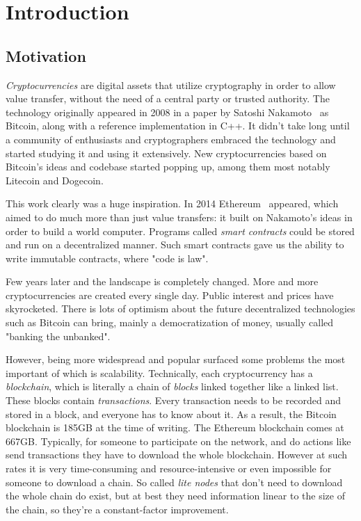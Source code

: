 \chapter{Introduction}

\section{Motivation}
\emph{Cryptocurrencies} are digital assets that utilize cryptography in order to allow value transfer, without the need of a central party or trusted authority. The technology originally appeared in 2008 in a paper by Satoshi Nakamoto~\cite{bitcoin} as Bitcoin, along with a reference implementation in C++. It didn't take long until a community of enthusiasts and cryptographers embraced the technology and started studying it and using it extensively. New cryptocurrencies based on Bitcoin's ideas and codebase started popping up, among them most notably Litecoin and Dogecoin.

This work clearly was a huge inspiration. In 2014 Ethereum~\cite{ethereum} appeared, which aimed to do much more than just value transfers: it built on Nakamoto's ideas in order to build a world computer. Programs called \emph{smart contracts} could be stored and run on a decentralized manner. Such smart contracts gave us the ability to write immutable contracts, where "code is law".

Few years later and the landscape is completely changed. More and more cryptocurrencies are created every single day. Public interest and prices have skyrocketed. There is lots of optimism about the future decentralized technologies such as Bitcoin can bring, mainly a democratization of money, usually called "banking the unbanked".

However, being more widespread and popular surfaced some problems the most important of which is scalability. Technically, each cryptocurrency has a \emph{blockchain}, which is literally a chain of \emph{blocks} linked together like a linked list. These blocks contain \emph{transactions}. Every transaction needs to be recorded and stored in a block, and everyone has to know about it. As a result, the Bitcoin blockchain is 185GB at the time of writing. The Ethereum blockchain comes at 667GB. Typically, for someone to participate on the network, and do actions like send transactions they have to download the whole blockchain. However at such rates it is very time-consuming and resource-intensive or even impossible for someone to download a chain. So called \emph{lite nodes} that don't need to download the whole chain do exist, but at best they need information linear to the size of the chain, so they're a constant-factor improvement.

